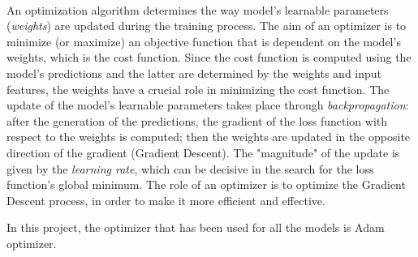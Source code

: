 \paragraph{} An optimization algorithm determines the way model's learnable parameters (\textit{weights}) are updated during the training process. The aim of an optimizer is to minimize (or maximize) an objective function that is dependent on the model's weights, which is the cost function. Since the cost function is computed using the model's predictions and the latter are determined by the weights and input features, the weights have a crucial role in minimizing the cost function. The update of the model's learnable parameters takes place through \textit{backpropagation}: after the generation of the predictions, the gradient of the loss function with respect to the weights is computed; then the weights are updated in the opposite direction of the gradient (Gradient Descent). The "magnitude" of the update is given by the \textit{learning rate}, which can be decisive in the search for the loss function's global minimum. The role of an optimizer is to optimize the Gradient Descent process, in order to make it more efficient and effective.

In this project, the optimizer that has been used for all the models is Adam optimizer.

